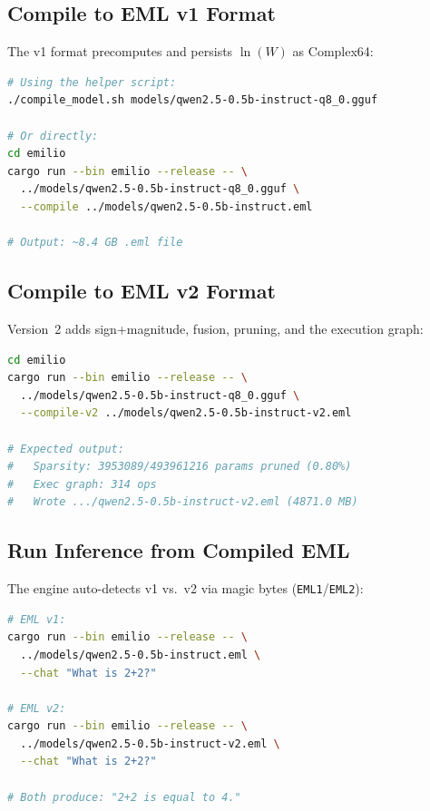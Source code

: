 \documentclass[acmsmall,nonacm]{acmart}
\begin{document}
\subsection{Compile to EML v1 Format}

The v1 format precomputes and persists $\ln(W)$ as Complex64:

\begin{lstlisting}[language=bash,caption={Compiling to EML v1.}]
# Using the helper script:
./compile_model.sh models/qwen2.5-0.5b-instruct-q8_0.gguf

# Or directly:
cd emilio
cargo run --bin emilio --release -- \
  ../models/qwen2.5-0.5b-instruct-q8_0.gguf \
  --compile ../models/qwen2.5-0.5b-instruct.eml

# Output: ~8.4 GB .eml file
\end{lstlisting}

\subsection{Compile to EML v2 Format}

Version~2 adds sign+magnitude, fusion, pruning, and the execution graph:

\begin{lstlisting}[language=bash,caption={Compiling to EML v2.}]
cd emilio
cargo run --bin emilio --release -- \
  ../models/qwen2.5-0.5b-instruct-q8_0.gguf \
  --compile-v2 ../models/qwen2.5-0.5b-instruct-v2.eml

# Expected output:
#   Sparsity: 3953089/493961216 params pruned (0.80%)
#   Exec graph: 314 ops
#   Wrote .../qwen2.5-0.5b-instruct-v2.eml (4871.0 MB)
\end{lstlisting}

\subsection{Run Inference from Compiled EML}

The engine auto-detects v1 vs.\ v2 via magic bytes (\texttt{EML1}/\texttt{EML2}):

\begin{lstlisting}[language=bash,caption={Inference from compiled .eml files.}]
# EML v1:
cargo run --bin emilio --release -- \
  ../models/qwen2.5-0.5b-instruct.eml \
  --chat "What is 2+2?"

# EML v2:
cargo run --bin emilio --release -- \
  ../models/qwen2.5-0.5b-instruct-v2.eml \
  --chat "What is 2+2?"

# Both produce: "2+2 is equal to 4."
\end{lstlisting}
\end{document}
